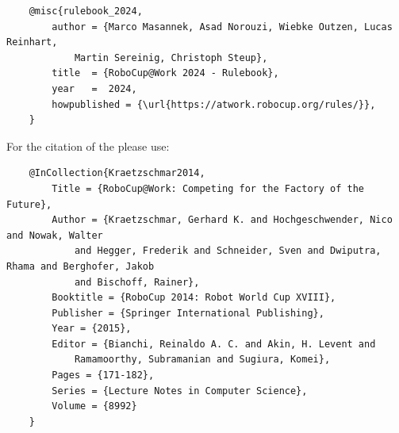 \begin{titlepage}
\begin{minipage}{\textwidth}
\begin{verbatim}
	@misc{rulebook_2024,
		author = {Marco Masannek, Asad Norouzi, Wiebke Outzen, Lucas Reinhart, 
			Martin Sereinig, Christoph Steup},
		title  = {RoboCup@Work 2024 - Rulebook},
		year   =  2024,
		howpublished = {\url{https://atwork.robocup.org/rules/}},
	}
\end{verbatim}


For the citation of the \RCAW please use:
\begin{verbatim}
	@InCollection{Kraetzschmar2014,
		Title = {RoboCup@Work: Competing for the Factory of the Future},
		Author = {Kraetzschmar, Gerhard K. and Hochgeschwender, Nico and Nowak, Walter
			and Hegger, Frederik and Schneider, Sven and Dwiputra, Rhama and Berghofer, Jakob
			and Bischoff, Rainer},
		Booktitle = {RoboCup 2014: Robot World Cup XVIII},
		Publisher = {Springer International Publishing},
		Year = {2015},
		Editor = {Bianchi, Reinaldo A. C. and Akin, H. Levent and
			Ramamoorthy, Subramanian and Sugiura, Komei},
		Pages = {171-182},
		Series = {Lecture Notes in Computer Science},
		Volume = {8992}
	}
\end{verbatim}
\end{minipage}




\end{titlepage}
